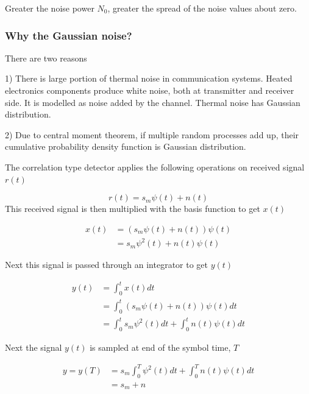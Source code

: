 \documentclass[a4paper]{article}
\numberwithin{equation}{subsection}
\begin{document}
	Greater the noise power $N_0$, greater the spread of the noise values about zero.
	
	\subsubsection*{Why the Gaussian noise?}
	
	There are two reasons
	
	1) There is large portion of thermal noise in communication systems. Heated electronics components produce white noise, both at transmitter and receiver side. It is modelled as noise added by the channel. Thermal noise has Gaussian distribution.
	
	2) Due to central moment theorem, if multiple random processes add up, their cumulative probability density function is Gaussian distribution.
	
	The correlation type detector applies the following operations on received signal $r(t)$
	
	\begin{equation}\label{key}
	r(t)=s_m \psi(t)+n(t)
	\end{equation}
	This received signal is then multiplied with the basis function to get $x(t)$
	
	\begin{equation}\label{key}
	\begin{aligned}
	x(t)
	&=(s_m \psi(t)+n(t))\psi(t) \\
	&=s_m \psi^2(t)+n(t)\psi(t)
	\end{aligned}
	\end{equation}
	

	
	Next this signal is passed through an integrator to get $y(t)$
	
	\begin{equation}\label{key}
	\begin{aligned}
	y(t)
	&=\int_0^t x(t)dt \\
	&=\int_0^t (s_m \psi(t)+n(t))\psi(t)dt \\
	&=\int_0^t s_m \psi^2(t)dt + \int_0^t n(t)\psi(t) dt
	\end{aligned}
	\end{equation}
	
	Next the signal $y(t)$ is sampled at end of the symbol time, $T$
	
	\begin{equation}\label{eq:y}
	\begin{aligned}
	y=y(T)
	&=s_m \int_0^T \psi^2(t)dt + \int_0^T n(t)\psi(t) dt \\
	&=s_m+n
	\end{aligned}
	\end{equation}
	
\end{document}
